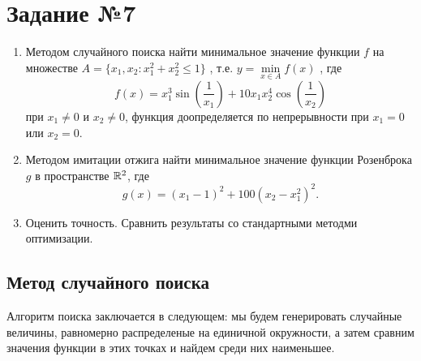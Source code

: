\section{Задание №7}

\begin{enumerate}
        \item Методом случайного поиска найти минимальное значение функции
$
        f
$ 
        на множестве 
$
        A = \{x_1, x_2 : x_1^2 + x_2^2 \leqslant 1\}
$
        , т.е.
$
        y = \min\limits_{x \in A} f(x)
$
        , где 
$$
        f(x) = x_1^3\sin\left(\frac{1}{x_1}\right) +10x_1 x_2^4\cos\left(\frac{1}{x_2}\right)
$$
        при $x_1 \neq 0$ и $x_2 \neq 0$, функция доопределяется по непрерывности при $x_1 = 0$ или $x_2 = 0$.
        
        \item Методом имитации отжига найти минимальное значение функции Розенброка $g$ в пространстве $\mathbb{R}^2$, где 
$$
        g(x) = (x_1-1)^2+100(x_2-x_1^2)^2.
$$

        \item Оценить точность. Сравнить результаты со стандартными методми оптимизации.
\end{enumerate}


\subsection{Метод случайного поиска}

Алгоритм поиска заключается в следующем: мы будем генерировать случайные величины, равномерно распределеные на единичной окружности, а затем сравним значения функции в этих точках и найдем среди них наименьшее.


